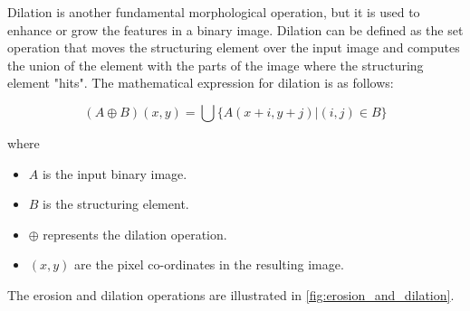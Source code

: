 Dilation is another fundamental morphological operation, but it is used to enhance or grow the features in a binary image. Dilation can be defined as the set operation that moves the structuring element over the input image and computes the union of the element with the parts of the image where the structuring element "hits". The mathematical expression for dilation is as follows:

\begin{equation}
    (A \oplus B)(x, y) = \bigcup \{A(x + i, y + j) | (i, j) \in B\}
    \label{eq:dilation}
\end{equation}

where
\begin{itemize}
    \item $A$ is the input binary image.
    \item $B$ is the structuring element.
    \item $\oplus$ represents the dilation operation.
    \item $(x, y)$ are the pixel co-ordinates in the resulting image.
\end{itemize}

The erosion and dilation operations are illustrated in \autoref{fig:erosion_and_dilation}.

